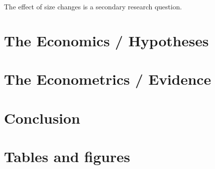 \documentclass{article}
\begin{document}
The effect of size changes is a secondary research question.



\section{The Economics / Hypotheses}



\section{The Econometrics / Evidence}



\section{Conclusion}





\newpage
\onehalfspacing



\newpage
\section*{Tables and figures}
\end{document}

